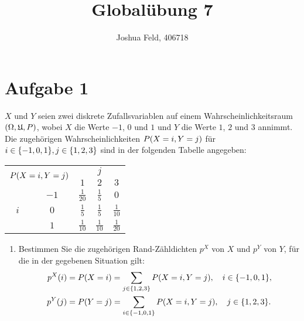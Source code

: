 \documentclass{exercise}
\institute{Institut für Statistik und Wirtschaftsmathematik}
\title{Globalübung 7}
\author{Joshua Feld, 406718}
\begin{document}
    \maketitle


    \section*{Aufgabe 1}
    
    \begin{problem}
        \(X\) und \(Y\) seien zwei diskrete Zufallsvariablen auf einem Wahrscheinlichkeitsraum \(\parentheses*{\Omega, \mathfrak{U}, P}\), wobei \(X\) die Werte \(-1\), \(0\) und \(1\) und \(Y\) die Werte \(1\), \(2\) und \(3\) annimmt.
        Die zugehörigen Wahrscheinlichkeiten \(P\parentheses*{X = i, Y = j}\) für \(i \in \braces*{-1, 0, 1}, j \in \braces*{1, 2, 3}\) sind in der folgenden Tabelle angegeben:
        \begin{center}
            \begin{tabular}{ccccc}
                \toprule
                \multicolumn{2}{c}{\multirow{2}{*}{\(P\parentheses*{X = i, Y = j}\)}} & \multicolumn{3}{c}{\(j\)}\\
                \multicolumn{2}{c}{\multirow{2}{*}{}} & \(1\) & \(2\) & \(3\)\\
                \midrule
                \multirow{3}{*}{\(i\)} & \(-1\) & \(\frac{1}{20}\) & \(\frac{1}{5}\) & \(0\)\\
                & \(0\) & \(\frac{1}{5}\) & \(\frac{1}{5}\) & \(\frac{1}{10}\)\\
                & \(1\) & \(\frac{1}{10}\) & \(\frac{1}{10}\) & \(\frac{1}{20}\)\\
                \bottomrule
            \end{tabular}
        \end{center}
        \begin{enumerate}
            \item Bestimmen Sie die zugehörigen Rand-Zähldichten \(p^X\) von \(X\) und \(p^Y\) von \(Y\), für die in der gegebenen Situation gilt:
            \begin{align*}
                p^X\parentheses*{i} &= P\parentheses*{X = i} = \sum_{j \in \braces*{1, 2, 3}}P\parentheses*{X = i, Y = j}, \quad i \in \braces*{-1, 0, 1},\\
                p^Y\parentheses*{j} &= P\parentheses*{Y = j} = \sum_{i \in \braces*{-1, 0, 1}}P\parentheses*{X = i, Y = j}, \quad j \in \braces*{1, 2, 3}.
            \end{align*}

\end{enumerate}
\end{problem}
\end{document}
